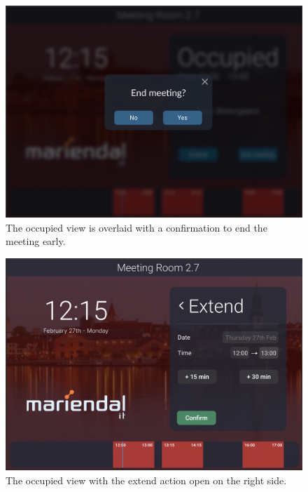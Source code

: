   \begin{figure}[h!]
    \centering
    \includegraphics[width=1\textwidth]{images/occupied_end_confirm.png}
    \caption{The occupied view is overlaid with a confirmation to end the meeting early.}
    \label{fig:occupied_end}
  \end{figure}

  \begin{figure}[h!]
    \centering
    \includegraphics[width=1\textwidth]{images/occupied_extend_2.png}
    \caption{The occupied view with the extend action open on the right side.}
    \label{fig:occupied_extend2}
  \end{figure}

